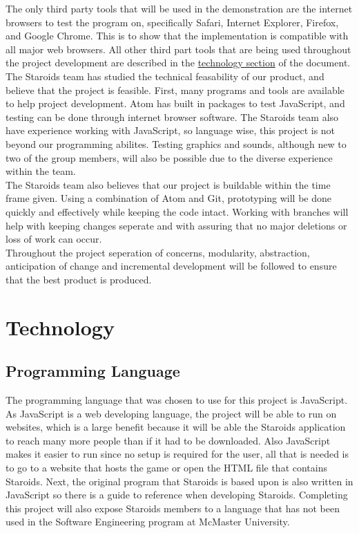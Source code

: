 \documentclass{article}
\begin{document}
The only third party tools that will be used in the demonstration are the internet browsers to test the program on, specifically Safari, Internet Explorer, Firefox, and Google Chrome. This is to show that the implementation is compatible with all major web browsers. All other third part tools that are being used throughout the project development are described in the \hyperref[technology:ide]{technology section} of the document.\\

The Staroids team has studied the technical feasability of our product, and believe that the project is feasible. First, many programs and tools are available to help project development. Atom has built in packages to test JavaScript, and testing can be done through internet browser software. The Staroids team also have experience working with JavaScript, so language wise, this project is not beyond our programming abilites. Testing graphics and sounds, although new to two of the group members, will also be possible due to the diverse experience within the team.\\
The Staroids team also believes that our project is buildable within the time frame given. Using a combination of Atom and Git, prototyping will be done quickly and effectively while keeping the code intact. Working with branches will help with keeping changes seperate and with assuring that no major deletions or loss of work can occur.\\
Throughout the project seperation of concerns, modularity, abstraction, anticipation of change and incremental development will be followed to ensure that the best product is produced.

\section{Technology}
\subsection{Programming Language}
The programming language that was chosen to use for this project is JavaScript. As JavaScript is a web developing language, the project will be able to run on websites, which is a large benefit because it will be able the Staroids application to reach many more people than if it had to be downloaded. Also JavaScript makes it easier to run since no setup is required for the user, all that is needed is to go to a website that hosts the game or open the HTML file that contains Staroids. Next, the original program that Staroids is based upon is also written in JavaScript so there is a guide to reference when developing Staroids. Completing this project will also expose Staroids members to a language that has not been used in the Software Engineering program at McMaster University.
\end{document}
